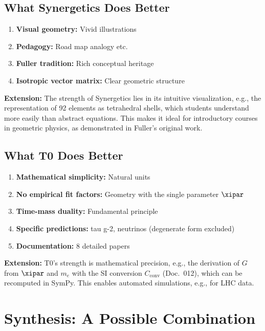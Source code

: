 	\subsection{What Synergetics Does Better}
	
	\begin{enumerate}
		\item \textbf{Visual geometry:} Vivid illustrations
		\item \textbf{Pedagogy:} Road map analogy etc.
		\item \textbf{Fuller tradition:} Rich conceptual heritage
		\item \textbf{Isotropic vector matrix:} Clear geometric structure
	\end{enumerate}
	
	\textbf{Extension:} The strength of Synergetics lies in its intuitive visualization, e.g., the representation of 92 elements as tetrahedral shells, which students understand more easily than abstract equations. This makes it ideal for introductory courses in geometric physics, as demonstrated in Fuller's original work.
	
	\subsection{What T0 Does Better}
	
	\begin{enumerate}
		\item \textbf{Mathematical simplicity:} Natural units
		\item \textbf{No empirical fit factors:} Geometry with the single parameter $\xipar$
		\item \textbf{Time-mass duality:} Fundamental principle
		\item \textbf{Specific predictions:} tau g-2, neutrinos (degenerate form excluded)
		\item \textbf{Documentation:} 8 detailed papers
	\end{enumerate}
	
	\textbf{Extension:} T0's strength is mathematical precision, e.g., the derivation of $G$ from $\xipar$ and $m_e$ with the SI conversion $C_{\text{conv}}$ (Doc.~012), which can be recomputed in SymPy. This enables automated simulations, e.g., for LHC data.
	
	\section{Synthesis: A Possible Combination}
	
